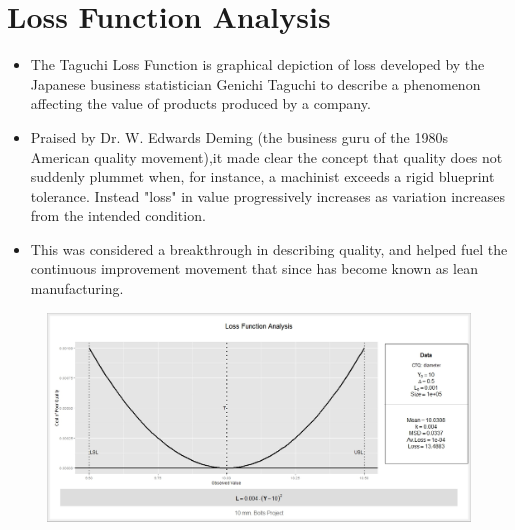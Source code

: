 \documentclass[SPC-MASTER.tex]{subfiles}
\begin{document}
	\Large
	
\section{Loss Function Analysis}
\begin{itemize}
\item The Taguchi Loss Function is graphical depiction of loss developed by the Japanese business statistician Genichi Taguchi to describe a phenomenon affecting the value of products produced by a company. 
\item Praised by Dr. W. Edwards Deming (the business guru of the 1980s American quality movement),it made clear the concept that quality does not suddenly plummet when, for instance, a machinist exceeds a rigid blueprint tolerance. Instead "loss" in value progressively increases as variation increases from the intended condition. 
\item This was considered a breakthrough in describing quality, and helped fuel the continuous improvement movement that since has become known as lean manufacturing.
\end{itemize}


\begin{figure}[h!]
\centering
\includegraphics[width=0.99\linewidth]{images/LossFunctionAnalysis}
\caption{}
\label{fig:LossFunctionAnalysis}
\end{figure}
\end{document}
